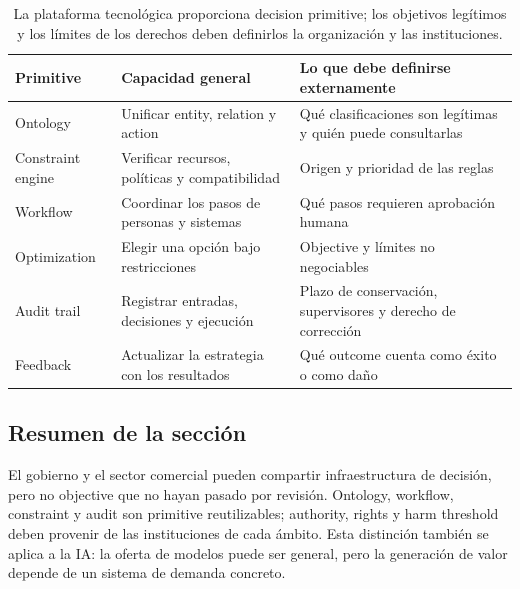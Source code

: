 \begin{table}[H]
\centering
\begin{tabular}{L{0.18\textwidth}L{0.34\textwidth}L{0.38\textwidth}}
\toprule
Primitive & Capacidad general & Lo que debe definirse externamente \\
\midrule
Ontology & Unificar entity, relation y action & Qué clasificaciones son legítimas y quién puede consultarlas \\
Constraint engine & Verificar recursos, políticas y compatibilidad & Origen y prioridad de las reglas \\
Workflow & Coordinar los pasos de personas y sistemas & Qué pasos requieren aprobación humana \\
Optimization & Elegir una opción bajo restricciones & Objective y límites no negociables \\
Audit trail & Registrar entradas, decisiones y ejecución & Plazo de conservación, supervisores y derecho de corrección \\
Feedback & Actualizar la estrategia con los resultados & Qué outcome cuenta como éxito o como daño \\
\bottomrule
\end{tabular}
\caption{La plataforma tecnológica proporciona decision primitive; los objetivos legítimos y los límites de los derechos deben definirlos la organización y las instituciones.}
\end{table}

\subsection{Resumen de la sección}

El gobierno y el sector comercial pueden compartir infraestructura de decisión, pero no objective que no hayan pasado por revisión. Ontology, workflow, constraint y audit son primitive reutilizables; authority, rights y harm threshold deben provenir de las instituciones de cada ámbito. Esta distinción también se aplica a la IA: la oferta de modelos puede ser general, pero la generación de valor depende de un sistema de demanda concreto.
